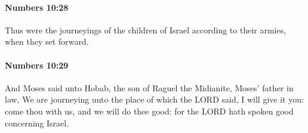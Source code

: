 		\paragraph{Numbers 10:28} %
			\label{NUMBERS-10-28}

			Thus were the journeyings of the children of Israel according to their armies, when they set forward.


		\paragraph{Numbers 10:29} %
			\label{NUMBERS-10-29}

			And Moses said unto Hobab, the son of Raguel the Midianite, Moses’ father in law, We are journeying unto the place of which the LORD said, I will give it you: come thou with us, and we will do thee good: for the LORD hath spoken good concerning Israel.


